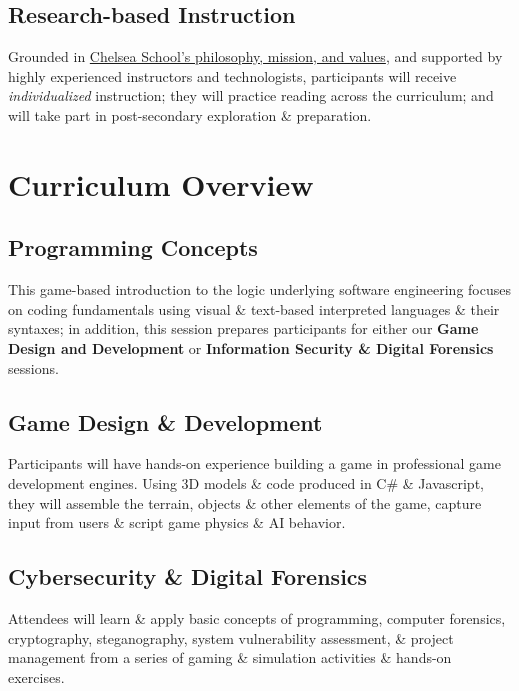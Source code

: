 \documentclass[letterpaper,10pt,english]{sphinxmanual}
\begin{document}
\subsection{Research-based Instruction}
\label{description:research-based-instruction}
Grounded in \href{http://chelseaschool.edu/about/}{Chelsea School's philosophy, mission, and values}, and supported by highly experienced instructors and technologists, participants will receive \emph{individualized} instruction; they will practice reading across the curriculum; and  will take part in post-secondary exploration \& preparation.


\section{Curriculum Overview}
\label{description:curriculum-overview}

\subsection{Programming Concepts}
\label{description:programming-concepts}
This game-based introduction to the logic underlying software engineering focuses on coding fundamentals using visual \& text-based interpreted languages \& their syntaxes; in addition, this session prepares participants for either our \textbf{Game Design and Development} or \textbf{Information Security \& Digital Forensics} sessions.


\subsection{Game Design \& Development}
\label{description:game-design-development}
Participants will have hands-on experience building a game in professional game development engines. Using 3D models \& code produced in C\# \& Javascript, they will assemble the terrain, objects \& other elements of the game, capture input from users \& script game physics \& AI behavior.


\subsection{Cybersecurity \& Digital Forensics}
\label{description:cybersecurity-digital-forensics}
Attendees will learn \& apply basic concepts of programming, computer forensics, cryptography, steganography, system vulnerability assessment, \& project management from a series of gaming \& simulation activities \& hands-on exercises.
\end{document}
